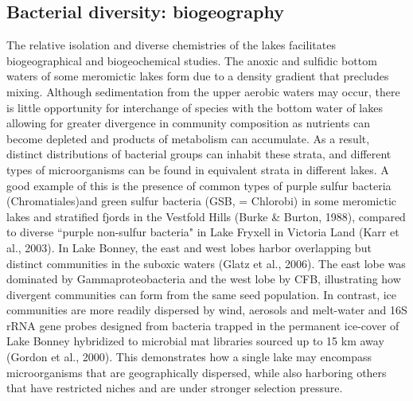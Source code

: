 \documentclass{book}
\begin{document}
\subsection{Bacterial diversity: biogeography}
The relative isolation and diverse chemistries of the lakes facilitates biogeographical and biogeochemical studies. 
The anoxic and sulfidic bottom waters of some meromictic lakes form due to a density gradient that precludes mixing. 
Although sedimentation from the upper aerobic waters may occur, there is little opportunity for interchange of species with the bottom water of lakes allowing for greater divergence in community composition as nutrients can become depleted and products of metabolism can accumulate.
As a result, distinct distributions of bacterial groups can inhabit these strata, and different types of microorganisms can be found in equivalent strata in different lakes. A good example of this is the presence of common types of purple sulfur bacteria (Chromatiales)and green sulfur bacteria (GSB, = Chlorobi) in some meromictic lakes and stratified fjords in the Vestfold Hills (Burke & Burton, 1988), compared to diverse “purple non-sulfur bacteria" in Lake Fryxell in Victoria Land (Karr et al., 2003). 
In Lake Bonney, the east and west lobes harbor overlapping but distinct communities in the suboxic waters (Glatz et al., 2006).
The east lobe was dominated by Gammaproteobacteria and the west lobe by CFB, illustrating how divergent communities can form from the same seed population. 
In contrast, ice communities are more readily dispersed by wind, aerosols and melt-water and 16S rRNA gene probes designed from bacteria trapped in the permanent ice-cover of Lake Bonney hybridized to microbial mat libraries sourced up to 15 km away (Gordon et al., 2000).
This demonstrates how a single lake may encompass microorganisms that are geographically dispersed, while also harboring others that have restricted niches and are under stronger selection pressure.
\end{document}
